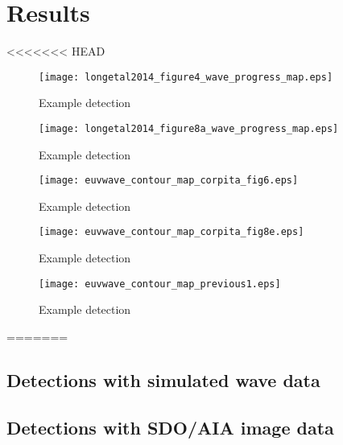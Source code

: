 \section{Results}\label{sec:results}

<<<<<<< HEAD
\begin{figure}
\begin{center}
\texttt{[image: longetal2014\_figure4\_wave\_progress\_map.eps]}

\caption{Example detection}
\label{corpita_fig7}
\end{center}
\end{figure}

\begin{figure}
\begin{center}
\texttt{[image: longetal2014\_figure8a\_wave\_progress\_map.eps]}
\caption{Example detection}
\label{corpita_fig8a}
\end{center}
\end{figure}

\begin{figure}
\begin{center}
\texttt{[image: euvwave\_contour\_map\_corpita\_fig6.eps]}
\caption{Example detection}
\label{corpita_fig6}
\end{center}
\end{figure}

\begin{figure}
\begin{center}
\texttt{[image: euvwave\_contour\_map\_corpita\_fig8e.eps]}
\caption{Example detection}
\label{corpita_fig8e}
\end{center}
\end{figure}

\begin{figure}
\begin{center}
\texttt{[image: euvwave\_contour\_map\_previous1.eps]}
\caption{Example detection}
\label{previous1}
\end{center}
\end{figure}
=======
\subsection{Detections with simulated wave data}

\subsection{Detections with SDO/AIA image data}

